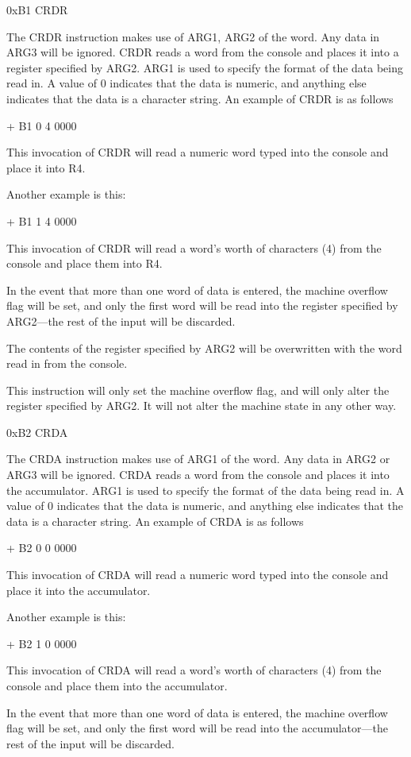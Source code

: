 \documentclass[]{article}
\begin{document}
0xB1 CRDR

The CRDR instruction makes use of ARG1, ARG2 of the word. Any data in
ARG3 will be ignored. CRDR reads a word from the console and places it
into a register specified by ARG2. ARG1 is used to specify the format of
the data being read in. A value of 0 indicates that the data is numeric,
and anything else indicates that the data is a character string. An
example of CRDR is as follows

+ B1 0 4 0000

This invocation of CRDR will read a numeric word typed into the console
and place it into R4.

Another example is this:

+ B1 1 4 0000

This invocation of CRDR will read a word's worth of characters (4) from
the console and place them into R4.

In the event that more than one word of data is entered, the machine
overflow flag will be set, and only the first word will be read into the
register specified by ARG2---the rest of the input will be discarded.

The contents of the register specified by ARG2 will be overwritten with
the word read in from the console.

This instruction will only set the machine overflow flag, and will only
alter the register specified by ARG2. It will not alter the machine
state in any other way.

0xB2 CRDA

The CRDA instruction makes use of ARG1 of the word. Any data in ARG2 or
ARG3 will be ignored. CRDA reads a word from the console and places it
into the accumulator. ARG1 is used to specify the format of the data
being read in. A value of 0 indicates that the data is numeric, and
anything else indicates that the data is a character string. An example
of CRDA is as follows

+ B2 0 0 0000

This invocation of CRDA will read a numeric word typed into the console
and place it into the accumulator.

Another example is this:

+ B2 1 0 0000

This invocation of CRDA will read a word's worth of characters (4) from
the console and place them into the accumulator.

In the event that more than one word of data is entered, the machine
overflow flag will be set, and only the first word will be read into the
accumulator---the rest of the input will be discarded.
\end{document}

